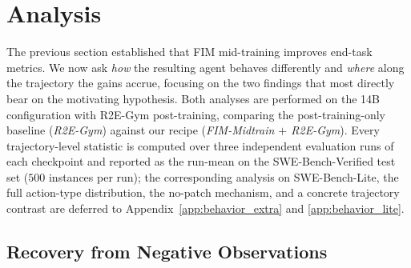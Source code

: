 
\section{Analysis}
\label{sec:analysis}

The previous section established that FIM mid-training improves end-task
metrics. We now ask \emph{how} the resulting agent behaves differently and
\emph{where} along the trajectory the gains accrue, focusing on the two
findings that most directly bear on the motivating hypothesis. Both
analyses are performed on the 14B configuration with R2E-Gym
post-training, comparing the post-training-only baseline (\emph{R2E-Gym})
against our recipe (\emph{FIM-Midtrain $+$ R2E-Gym}). Every
trajectory-level statistic is computed over three independent evaluation
runs of each checkpoint and reported as the run-mean on the
SWE-Bench-Verified test set ($500$ instances per run); the corresponding
analysis on SWE-Bench-Lite, the full action-type distribution, the
no-patch mechanism, and a concrete trajectory contrast are deferred to
Appendix~\ref{app:behavior_extra} and \ref{app:behavior_lite}.

\subsection{Recovery from Negative Observations}
\label{sec:analysis:recovery}


